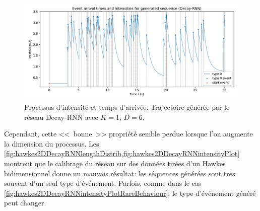 \documentclass[../main.tex]{subfiles}
\begin{document}
\begin{figure}[htp]
	\includegraphics[width=\linewidth]{../results/intensity_Decay-RNN_1d_hidden6_20181201-220235.pdf}
	\caption{Processus d'intensité et temps d'arrivée. Trajectoire générée par le réseau Decay-RNN avec $K=1$, $D=6$.}\label{fig:hawkes1DRNNintensityPlot}
\end{figure}


Cependant, cette <<~bonne~>> propriété semble perdue lorsque l'on augmente la dimension du processus. Les \cref{fig:hawkes2DDecayRNNlengthDistrib,fig:hawkes2DDecayRNNintensityPlot} montrent que le calibrage du réseau sur des données tirées d'un Hawkes bidimensionnel donne un mauvais résultat: les séquences générées sont très souvent d'un seul type d'événement. Parfois, comme dans le cas \cref{fig:hawkes2DDecayRNNintensityPlotRareBehaviour}, le type d'événement généré peut changer.
\end{document}

